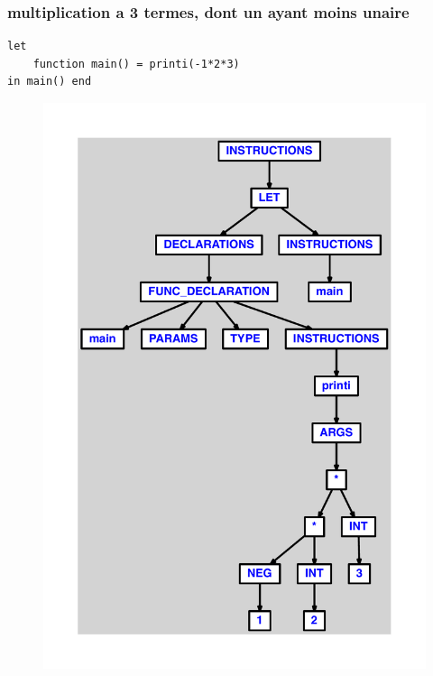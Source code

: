 \documentclass{article}
\begin{document}
\subsubsection{multiplication a 3 termes, dont un ayant moins unaire}
\begin{lstlisting}
let
	function main() = printi(-1*2*3)
in main() end
\end{lstlisting}
\newpage
\begin{figure}[H]
\centering
\includegraphics[max width=\textwidth]{ast/ast_73.pdf}
\end{figure}
\newpage
\end{document}
